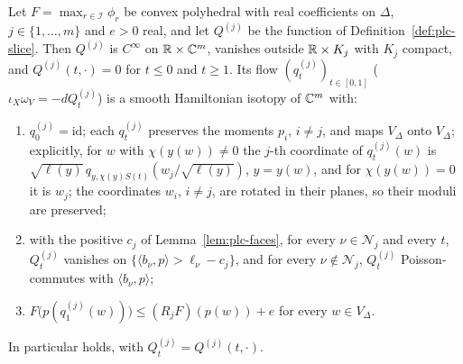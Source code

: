 \begin{theorem}\label{thm:plc-lift}
Let $F=\max_{r\in\mathcal I}\phi_r$ be convex polyhedral with real coefficients on $\Delta$, $j\in\{1,\dots,m\}$ and $e>0$ real, and let $Q^{(j)}$
be the function of Definition~\ref{def:plc-slice}. Then $Q^{(j)}$ is $C^\infty$ on $\mathbb{R}\times\mathbb{C}^m$, vanishes outside $\mathbb{R}\times K_j$
with $K_j$ compact, and $Q^{(j)}(t,\cdot)=0$ for $t\le0$ and $t\ge1$. Its flow $(q^{(j)}_t)_{t\in[0,1]}$ ($\iota_X\omega_V=-dQ^{(j)}_t$) is a smooth
Hamiltonian isotopy of $\mathbb{C}^m$ with:
\begin{enumerate}[label=(\alph*)]
\item $q^{(j)}_0=\mathrm{id}$; each $q^{(j)}_t$ preserves the moments $p_i$, $i\ne j$, and maps $V_\Delta$ onto $V_\Delta$; explicitly,
 for $w$ with $\chi(y(w))\ne0$ the $j$-th coordinate of $q^{(j)}_t(w)$ is $\sqrt{\ell(y)}\,q_{y,\chi(y)S(t)}(w_j/\sqrt{\ell(y)})$, $y=y(w)$,
 and for $\chi(y(w))=0$ it is $w_j$; the coordinates $w_i$, $i\ne j$, are rotated in their planes, so their moduli are
 preserved;
\item with the positive $c_j$ of Lemma~\ref{lem:plc-faces}, for every $\nu\in\mathcal N_j$ and every $t$, $Q^{(j)}_t$ vanishes on
 $\{\langle b_\nu,p\rangle>\ell_\nu-c_j\}$, and for every $\nu\notin\mathcal N_j$, $Q^{(j)}_t$ Poisson-commutes with $\langle b_\nu,p\rangle$;
\item $F\bigl(p(q^{(j)}_1(w))\bigr)\le(R_jF)(p(w))+e$ for every $w\in V_\Delta$.
\end{enumerate}
In particular  holds, with $Q^{(j)}_t=Q^{(j)}(t,\cdot)$.
\end{theorem}

